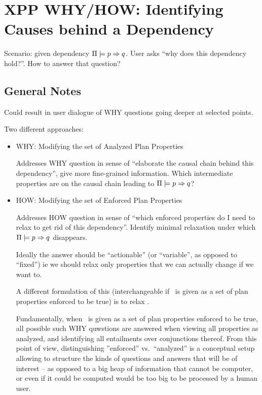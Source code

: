 \section{XPP WHY/HOW: Identifying Causes behind a Dependency}
\label{xpp-identify-causes}

Scenario: given dependency $\Pi \models p \Rightarrow q$. User
asks ``why does this dependency hold?''. How to answer that question?



\subsection{General Notes}

Could result in user dialogue of WHY questions going deeper at
selected points.

Two different approaches:
\begin{itemize}
\item WHY: Modifying the set of Analyzed Plan Properties

  Addresses WHY question in sense of ``elaborate the causal chain
  behind this dependency'', give more fine-grained information. Which
  intermediate properties are on the causal chain leading to
  $\Pi \models p \Rightarrow q$?

\item HOW: Modifying the set of Enforced Plan Properties

  Addresses HOW question in sense of ``which enforced properties do I
  need to relax to get rid of this dependency''. Identify minimal
  relaxation under which $\Pi \models p \Rightarrow q$ disappears.

  Ideally the answer should be ``actionable'' (or ``variable'', as
  opposed to ``fixed'') ie we should relax only properties that we can
  actually change if we want to.

  A different formulation of this (interchangeable if \plans\ is given
  as a set of plan properties enforced to be true) is to relax \prop.

  Fundamentally, when \plans\ is given as a set of plan properties
  enforced to be true, all possible such WHY quwstions are answered
  when viewing all properties as analyzed, and identifying all
  entailments over conjunctions thereof. From this point of view,
  distinguishing ''enforced'' vs.\ ``analyzed'' is a conceptual setup
  allowing to structure the kinds of questions and answers that will
  be of interest -- as opposed to a big heap of information that
  cannot be computer, or even if it could be computed would be too big
  to be processed by a human user.

\end{itemize}

